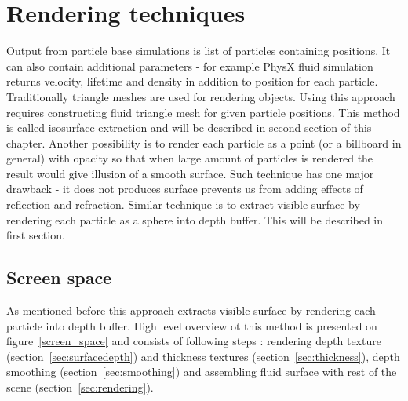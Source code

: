
\chapter{Rendering techniques} %

\graphicspath{{2/figures/}}


Output from particle base simulations is list of particles containing positions. It can also contain additional parameters - for example PhysX fluid simulation returns velocity, lifetime and density in addition to position for each particle. 
Traditionally triangle meshes are used for rendering objects. Using this approach requires constructing fluid triangle mesh for given particle positions. This method is called isosurface extraction and will be described in second section of this chapter. 
Another possibility is to render each particle as a point (or a billboard in general) with opacity so that when large amount of particles is rendered the result would give illusion of a smooth surface. Such technique has one major drawback - it does not produces surface prevents us from adding effects of reflection and refraction.
Similar technique is to extract visible surface by rendering each particle as a sphere into depth buffer. This will be described in first section.

\section{Screen space}
As mentioned before this approach extracts visible surface by rendering each particle into depth buffer. High level overview ot this method is presented on figure~\ref{screen_space} and consists of following steps \cite{laanSainz2009}: rendering depth texture (section~\ref{sec:surfacedepth}) and thickness textures (section~\ref{sec:thickness}), depth smoothing (section~\ref{sec:smoothing}) and assembling fluid surface with rest of the scene (section~\ref{sec:rendering}).

